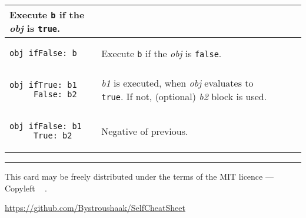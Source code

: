 \documentclass[10pt]{article}
\begin{document}
\begin{multicols*}{3}
\begin{tabular}{ p{70pt} p{140pt} l l }
Execute \texttt{b} if the \textit{obj} is \texttt{true}.

\\\hline %

\begin{lstlisting}
obj ifFalse: b
\end{lstlisting}
&\vspace*{0.25cm}

Execute \texttt{b} if the \textit{obj} is \texttt{false}.

\\\hline %

\begin{lstlisting}
obj ifTrue: b1
     False: b2
\end{lstlisting}
&\vspace*{0.1cm}

\textit{b1} is executed, when \textit{obj} evaluates to \texttt{true}.
If not, (optional) \textit{b2} block is used.

\\\hline %

\begin{lstlisting}
obj ifFalse: b1
     True: b2
\end{lstlisting}
&\vspace*{0.4cm}

Negative of previous.

\\\hline %

\end{tabular}





\vfill \hrule\smallskip
{\small This card may be freely distributed under
the terms of the MIT licence ---
Copyleft \textcopyleft\ \thedate{} \href{http://kitakitsune.org}{\theauthor}.

\url{https://github.com/Bystroushaak/SelfCheatSheet}
}

\end{multicols*}
\end{document}
